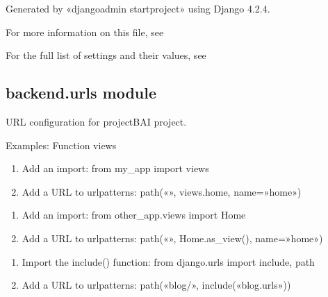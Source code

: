 \documentclass[letterpaper,11pt,polish]{sphinxmanual}
\begin{document}
\sphinxAtStartPar
Generated by «django\sphinxhyphen{}admin startproject» using Django 4.2.4.

\sphinxAtStartPar
For more information on this file, see

\sphinxAtStartPar
For the full list of settings and their values, see


\subsection{backend.urls module}
\label{\detokenize{backend:module-backend.urls}}\label{\detokenize{backend:backend-urls-module}}
\sphinxAtStartPar
URL configuration for projectBAI project.
\begin{description}
\sphinxAtStartPar
{}

\end{description}

\sphinxAtStartPar
Examples:
Function views
\begin{enumerate}
%
\item {} 
\sphinxAtStartPar
Add an import:  from my\_app import views

\item {} 
\sphinxAtStartPar
Add a URL to urlpatterns:  path(«», views.home, name=»home»)

\end{enumerate}
\begin{description}
\begin{enumerate}
%
\item {} 
\sphinxAtStartPar
Add an import:  from other\_app.views import Home

\item {} 
\sphinxAtStartPar
Add a URL to urlpatterns:  path(«», Home.as\_view(), name=»home»)

\end{enumerate}

\begin{enumerate}
%
\item {} 
\sphinxAtStartPar
Import the include() function: from django.urls import include, path

\item {} 
\sphinxAtStartPar
Add a URL to urlpatterns:  path(«blog/», include(«blog.urls»))

\end{enumerate}

\end{description}
\end{document}
